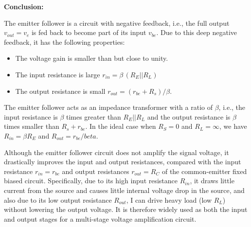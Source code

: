 \documentclass{article}
\begin{document}
{\bf Conclusion:} 

The emitter follower is a circuit with negative feedback, i.e., the full
output $v_{out}=v_e$ is fed back to become part of its input $v_{be}$. Due 
to this deep negative feedback, it has the following properties:
\begin{itemize}
\item The voltage gain is smaller than but close to unity. 
\item The input resistance is large $r_{in}=\beta \,(R_E||R_L)$
\item The output resistance is small $r_{out}=(r_{be}+R_s)/\beta$.
\end{itemize}

The emitter follower acts as an impedance transformer with a ratio 
of $\beta$, i.e., the input resistance is $\beta$ times greater than 
$R_E||R_L$ and the output resistance is $\beta$ times smaller than 
$R_s+r_{be}$. In the ideal case when $R_S=0$ and $R_L=\infty$, we have
$R_{in}=\beta R_E$ and $R_{out}=r_{be}/beta$.

Although the emitter follower circuit does not amplify the signal voltage, 
it drastically improves the input and output resistances, compared with 
the input resistance $r_{in}=r_{be}$ and output resistances $r_{out}=R_C$ of 
the common-emitter fixed biased circuit. Specifically, due to its high input
resistance $R_{in}$, it draws little current from the source and causes
little internal voltage drop in the source, and also due to its low output 
resistance $R_{out}$, I can drive heavy load (low $R_L$) without lowering 
the output voltage. It is therefore widely used as both the input and output
stages for a multi-stage voltage amplification circuit.


\begin{comment}
\htmladdimg{../figures/CCCE.png}

$V_{CC}=10\,V$, $\beta=100$, $R_{b1}=100\;k\Omega$, $R_{e1}=0.5\,k\Omega$,
\begin{equation}
V_{e1}=\frac{V_{CC}-V_{be}}{R_{b1}+(\beta+1)R_{e1}}(\beta+1)R_{e1}
=\frac{9.3}{100+101\times 0.5}(101\times 0.5)=3.1\,V
\end{equation}
\begin{equation}
V_{e2}=V_{b2}-V_{be}=3.1-0.7=2.4\,V,\;\;\;\;\;\;
I_{c2}=\frac{V_{e2}}{R_{e2}}=\frac{2.4}{0.5}=4.8\,mA
\end{equation}
For $V_{ce2}=V_{CC}/2=5\,V$, voltage across $R_{c2}$ needs to be 
\end{comment}
\end{document}
